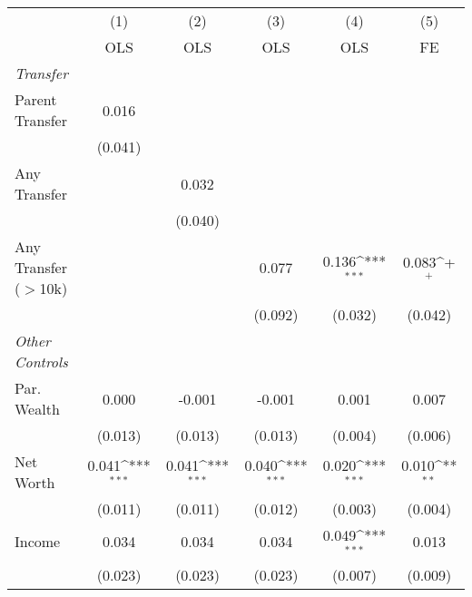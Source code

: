 {
\def\sym#1{\ifmmode^{#1}\else\(^{#1}\)\fi}
\begin{tabular}{l*{5}{c}}
\toprule
                &\multicolumn{1}{c}{(1)}&\multicolumn{1}{c}{(2)}&\multicolumn{1}{c}{(3)}&\multicolumn{1}{c}{(4)}&\multicolumn{1}{c}{(5)}\\
                &\multicolumn{1}{c}{OLS}&\multicolumn{1}{c}{OLS}&\multicolumn{1}{c}{OLS}&\multicolumn{1}{c}{OLS}&\multicolumn{1}{c}{FE}\\
\midrule
\textit{Transfer}&                  &                  &                  &                  &                  \\
\;Parent Transfer&    0.016         &                  &                  &                  &                  \\
                &  (0.041)         &                  &                  &                  &                  \\
\;Any Transfer  &                  &    0.032         &                  &                  &                  \\
                &                  &  (0.040)         &                  &                  &                  \\
\;Any Transfer ($>$10k)&                  &                  &    0.077         &    0.136\sym{***}&    0.083\sym{+}  \\
                &                  &                  &  (0.092)         &  (0.032)         &  (0.042)         \\
\textit{Other Controls}&                  &                  &                  &                  &                  \\
\;Par. Wealth   &    0.000         &   -0.001         &   -0.001         &    0.001         &    0.007         \\
                &  (0.013)         &  (0.013)         &  (0.013)         &  (0.004)         &  (0.006)         \\
\;Net Worth     &    0.041\sym{***}&    0.041\sym{***}&    0.040\sym{***}&    0.020\sym{***}&    0.010\sym{**} \\
                &  (0.011)         &  (0.011)         &  (0.012)         &  (0.003)         &  (0.004)         \\
\;Income        &    0.034         &    0.034         &    0.034         &    0.049\sym{***}&    0.013         \\
                &  (0.023)         &  (0.023)         &  (0.023)         &  (0.007)         &  (0.009)         \\

\end{tabular}}
